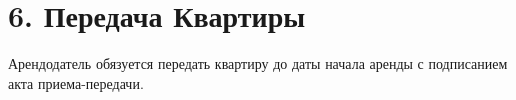 \section*{6. Передача Квартиры}
Арендодатель обязуется передать квартиру до даты начала аренды с подписанием акта приема-передачи.
